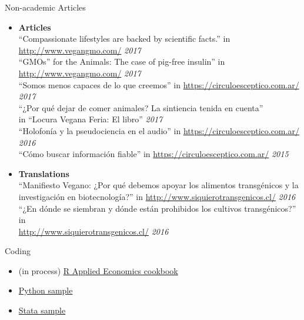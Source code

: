\documentclass{resume} %
\begin{document}
\begin{rSection}{Non-academic Articles}
\begin{itemize}
\item {\bf Articles}
\\ “Compassionate lifestyles are backed by scientific facts.” in \url{http://www.vegangmo.com/} \hfill {\em 2017}
\\ “GMOs” for the Animals: The case of pig-free insulin” in \url{http://www.vegangmo.com/} \hfill {\em 2017}
\\ “Somos menos capaces de lo que creemos” in \url{https://circuloesceptico.com.ar/} \hfill {\em 2017}  
\\ “¿Por qué dejar de comer animales? La sintiencia tenida en cuenta” \\ in “Locura Vegana Feria: El libro” \hfill {\em 2017} 
\\ “Holofonía y la pseudociencia en el audio” in \url{https://circuloesceptico.com.ar/} \hfill {\em 2016} 
\\ “Cómo buscar información fiable” in \url{https://circuloesceptico.com.ar/} \hfill {\em 2015} 
\item {\bf Translations}
\\ “Manifiesto Vegano: ¿Por qué debemos apoyar los alimentos transgénicos y la investigación en biotecnología?” in \url{http://www.siquierotransgenicos.cl/} \hfill {\em 2016} 
\\ “¿En dónde se siembran y dónde están prohibidos los cultivos transgénicos?” in \\ \url{http://www.siquierotransgenicos.cl/} \hfill {\em 2016} 



\end{itemize}

\end{rSection}

\begin{rSection}{Coding}
\begin{itemize}
\item  (in process) \href{https://drive.google.com/file/d/1yt3uI4X8O5Wjk_SEH01iFxirgr1q1j6q/view?usp=sharing}{R Applied Economics cookbook}
\item \href{https://github.com/jnccabral/Using-words-as-regressors}{Python sample}
\item \href{https://github.com/jnccabral/Di-tella-and-Schargrodsky-2004-replication}{Stata sample}
\end{itemize}
\end{rSection}
\end{document}
